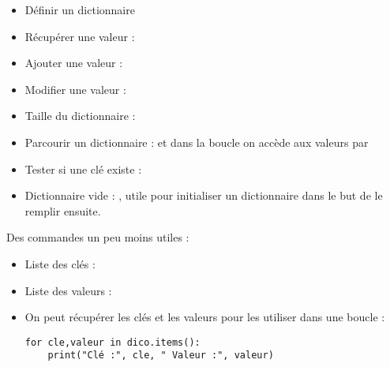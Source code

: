 \documentclass[11pt,class=report,crop=false]{standalone}
\begin{document}
\begin{cours}[Dictionnaire]
\begin{itemize}
  \item Définir un dictionnaire 
  
  \item Récupérer une valeur : 
  
  \item Ajouter une valeur : 
  
  \item Modifier une valeur : 
  
  \item Taille du dictionnaire : 
  
  \item Parcourir un dictionnaire :  et dans la boucle on accède aux valeurs par 
  
  \item Tester si une clé existe : 
  
  \item Dictionnaire vide : , utile pour initialiser un dictionnaire dans le but de le remplir ensuite.
\end{itemize}  

\bigskip

Des commandes un peu moins utiles :
\begin{itemize}
 
  \item Liste des clés : 
  
  \item Liste des valeurs : 
  
  \item On peut récupérer les clés et les valeurs pour les utiliser dans une boucle :
\begin{lstlisting}
for cle,valeur in dico.items():
    print("Clé :", cle, " Valeur :", valeur)
\end{lstlisting}
\end{itemize}

\end{cours}


\end{document}
